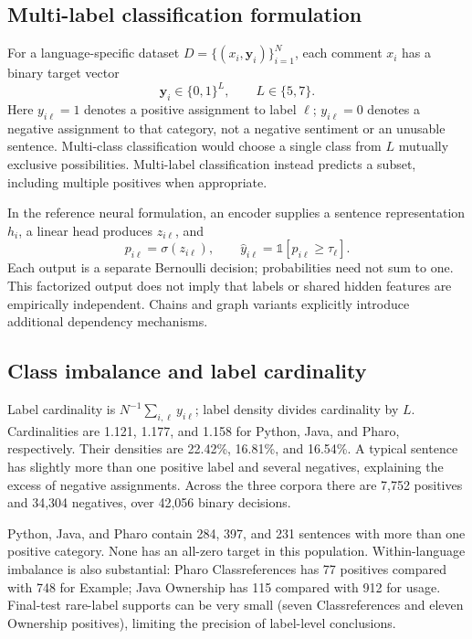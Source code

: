 \subsection{Multi-label classification formulation}
For a language-specific dataset $D=\{(x_i,\mathbf y_i)\}_{i=1}^N$, each comment $x_i$ has a binary target vector
\begin{equation}
\mathbf y_i\in\{0,1\}^{L},\qquad L\in\{5,7\}.
\end{equation}
Here $y_{i\ell}=1$ denotes a positive assignment to label $\ell$; $y_{i\ell}=0$ denotes a negative assignment to that category, not a negative sentiment or an unusable sentence. Multi-class classification would choose a single class from $L$ mutually exclusive possibilities. Multi-label classification instead predicts a subset, including multiple positives when appropriate.

In the reference neural formulation, an encoder supplies a sentence representation $h_i$, a linear head produces $z_{i\ell}$, and
\begin{equation}
p_{i\ell}=\sigma(z_{i\ell}),\qquad
\widehat y_{i\ell}=\mathbb{1}[p_{i\ell}\geq\tau_\ell].
\end{equation}
Each output is a separate Bernoulli decision; probabilities need not sum to one. This factorized output does not imply that labels or shared hidden features are empirically independent. Chains and graph variants explicitly introduce additional dependency mechanisms.

\subsection{Class imbalance and label cardinality}
Label cardinality is $N^{-1}\sum_{i,\ell} y_{i\ell}$; label density divides cardinality by $L$. Cardinalities are 1.121, 1.177, and 1.158 for Python, Java, and Pharo, respectively. Their densities are 22.42\%, 16.81\%, and 16.54\%. A typical sentence has slightly more than one positive label and several negatives, explaining the excess of negative assignments. Across the three corpora there are 7,752 positives and 34,304 negatives, over 42,056 binary decisions.

Python, Java, and Pharo contain 284, 397, and 231 sentences with more than one positive category. None has an all-zero target in this population. Within-language imbalance is also substantial: Pharo Classreferences has 77 positives compared with 748 for Example; Java Ownership has 115 compared with 912 for usage. Final-test rare-label supports can be very small (seven Classreferences and eleven Ownership positives), limiting the precision of label-level conclusions.

